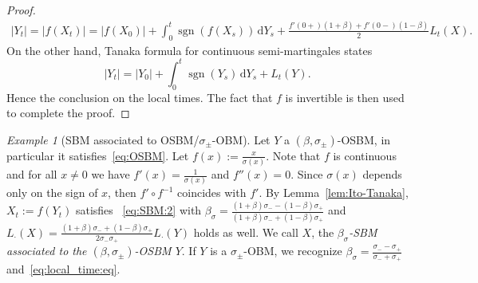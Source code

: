 \documentclass[12pt]{article}
\numberwithin{equation}{section}
\theoremstyle{definition}
\theoremstyle{remark}
\newtheorem{example}{Example}
\newcommand{\vd}{\,\mathrm{d}}
\DeclareMathOperator{\sgn}{sgn}
\begin{document}
\begin{proof}
\begin{multline}
	|Y_t|=|f(X_t)| = |f(X_0)| +  \int_0^t  \sgn(f(X_s))  \vd Y_s  + \frac{f'(0+) (1+\beta) + f'(0-) (1-\beta) }{ 2 }   L_t(X).
\end{multline}
On the other hand, Tanaka formula for continuous semi-martingales states
\[
	|Y_t|= |Y_0| + \int_0^t \sgn(Y_s) \vd Y_s + L_t(Y).
\]
Hence the conclusion on the local times. 
The fact that $f$ is invertible is then used to complete the proof.
\end{proof}
%
%

\begin{example}[SBM associated to OSBM/$\sigma_\pm$-OBM]
\label{exa:OBM-SBM} 
Let $Y$ a $(\beta,\sigma_\pm)$-OSBM, in particular it satisfies~\eqref{eq:OSBM}.
Let $f(x):=\frac{x}{\sigma(x)}$.
Note that $f$ is continuous and for all $x\neq 0$ we have $f'(x)=\frac1{\sigma(x)}$ and $f''(x)=0$. 
Since $\sigma(x)$ depends only on the sign of $x$, then $f'\circ f^{-1}$ coincides with $f'$.
By Lemma~\ref{lem:Ito-Tanaka}, $X_t:=f(Y_t)$ satisfies
~\eqref{eq:SBM:2} with 
$
	\beta_\sigma= \frac{(1+\beta)\sigma_--(1-\beta)\sigma_+}{(1+\beta)\sigma_-+(1-\beta)\sigma_+}
$
and $L_{\cdot}(X) = \frac{(1+\beta)\sigma_-+(1-\beta)\sigma_+}{2\sigma_-\sigma_+}L_{\cdot}(Y)$ holds as well.
We call $X$, the {\em $\beta_\sigma$-SBM associated to the $(\beta,\sigma_\pm)$-OSBM $Y$\/}.
If $Y$ is a $\sigma_\pm$-OBM, we recognize $\beta_\sigma=\frac{\sigma_--\sigma_+}{\sigma_-+\sigma_+}$ and~\eqref{eq:local_time:eq}.
\end{example}
\end{document}
